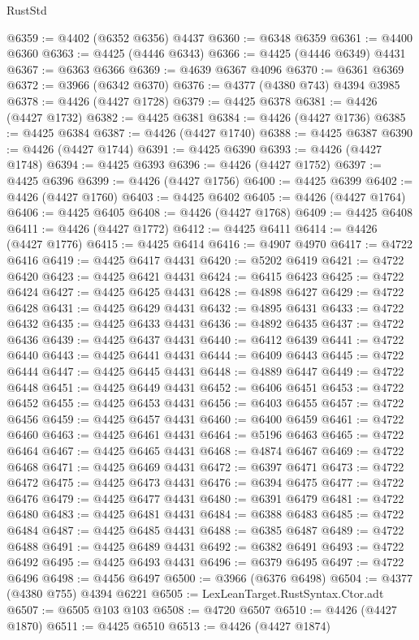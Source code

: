 \begin{lexlean}{RustStd}
\begin{coremodule}
@6359 := @4402 (@6352 @6356) @4437
@6360 := @6348 @6359
@6361 := @4400 @6360
@6363 := @4425 (@4446 @6343)
@6366 := @4425 (@4446 @6349) @4431
@6367 := @6363 @6366
@6369 := @4639 @6367 @4096
@6370 := @6361 @6369
@6372 := @3966 (@6342 @6370)
@6376 := @4377 (@4380 @743) @4394 @3985
@6378 := @4426 (@4427 @1728)
@6379 := @4425 @6378
@6381 := @4426 (@4427 @1732)
@6382 := @4425 @6381
@6384 := @4426 (@4427 @1736)
@6385 := @4425 @6384
@6387 := @4426 (@4427 @1740)
@6388 := @4425 @6387
@6390 := @4426 (@4427 @1744)
@6391 := @4425 @6390
@6393 := @4426 (@4427 @1748)
@6394 := @4425 @6393
@6396 := @4426 (@4427 @1752)
@6397 := @4425 @6396
@6399 := @4426 (@4427 @1756)
@6400 := @4425 @6399
@6402 := @4426 (@4427 @1760)
@6403 := @4425 @6402
@6405 := @4426 (@4427 @1764)
@6406 := @4425 @6405
@6408 := @4426 (@4427 @1768)
@6409 := @4425 @6408
@6411 := @4426 (@4427 @1772)
@6412 := @4425 @6411
@6414 := @4426 (@4427 @1776)
@6415 := @4425 @6414
@6416 := @4907 @4970
@6417 := @4722 @6416
@6419 := @4425 @6417 @4431
@6420 := @5202 @6419
@6421 := @4722 @6420
@6423 := @4425 @6421 @4431
@6424 := @6415 @6423
@6425 := @4722 @6424
@6427 := @4425 @6425 @4431
@6428 := @4898 @6427
@6429 := @4722 @6428
@6431 := @4425 @6429 @4431
@6432 := @4895 @6431
@6433 := @4722 @6432
@6435 := @4425 @6433 @4431
@6436 := @4892 @6435
@6437 := @4722 @6436
@6439 := @4425 @6437 @4431
@6440 := @6412 @6439
@6441 := @4722 @6440
@6443 := @4425 @6441 @4431
@6444 := @6409 @6443
@6445 := @4722 @6444
@6447 := @4425 @6445 @4431
@6448 := @4889 @6447
@6449 := @4722 @6448
@6451 := @4425 @6449 @4431
@6452 := @6406 @6451
@6453 := @4722 @6452
@6455 := @4425 @6453 @4431
@6456 := @6403 @6455
@6457 := @4722 @6456
@6459 := @4425 @6457 @4431
@6460 := @6400 @6459
@6461 := @4722 @6460
@6463 := @4425 @6461 @4431
@6464 := @5196 @6463
@6465 := @4722 @6464
@6467 := @4425 @6465 @4431
@6468 := @4874 @6467
@6469 := @4722 @6468
@6471 := @4425 @6469 @4431
@6472 := @6397 @6471
@6473 := @4722 @6472
@6475 := @4425 @6473 @4431
@6476 := @6394 @6475
@6477 := @4722 @6476
@6479 := @4425 @6477 @4431
@6480 := @6391 @6479
@6481 := @4722 @6480
@6483 := @4425 @6481 @4431
@6484 := @6388 @6483
@6485 := @4722 @6484
@6487 := @4425 @6485 @4431
@6488 := @6385 @6487
@6489 := @4722 @6488
@6491 := @4425 @6489 @4431
@6492 := @6382 @6491
@6493 := @4722 @6492
@6495 := @4425 @6493 @4431
@6496 := @6379 @6495
@6497 := @4722 @6496
@6498 := @4456 @6497
@6500 := @3966 (@6376 @6498)
@6504 := @4377 (@4380 @755) @4394 @6221
@6505 := LexLeanTarget.RustSyntax.Ctor.adt
@6507 := @6505 @103 @103
@6508 := @4720 @6507
@6510 := @4426 (@4427 @1870)
@6511 := @4425 @6510
@6513 := @4426 (@4427 @1874)

\end{coremodule}
\end{lexlean}
